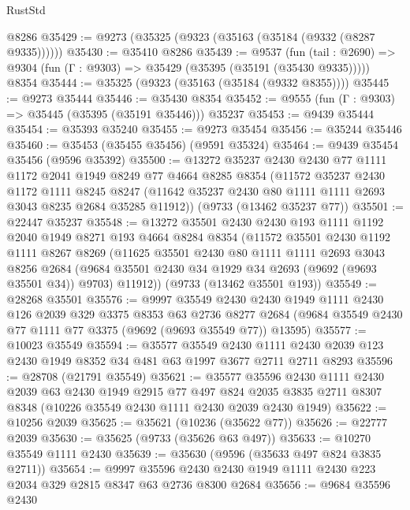 \begin{lexlean}{RustStd}
\begin{coremodule}
{\begin{coremodule}
{{{{{{{{{{{{{{{{{{{{{{{{{{{{{{{{{{{{{{{{{{{{{{{{{{{{{{{    @8286
@35429 := @9273 (@35325 (@9323 (@35163 (@35184 (@9332 (@8287 @9335))))))
@35430 := @35410 @8286
@35439 := @9537
    (fun (tail : @2690) => @9304 (fun (Γ : @9303) => @35429 (@35395 (@35191 (@35430 @9335)))))
    @8354
@35444 := @35325 (@9323 (@35163 (@35184 (@9332 @8355))))
@35445 := @9273 @35444
@35446 := @35430 @8354
@35452 := @9555 (fun (Γ : @9303) => @35445 (@35395 (@35191 @35446))) @35237
@35453 := @9439 @35444
@35454 := @35393 @35240
@35455 := @9273 @35454
@35456 := @35244 @35446
@35460 := @35453 (@35455 @35456) (@9591 @35324)
@35464 := @9439 @35454 @35456 (@9596 @35392)
@35500 := @13272
    @35237
    @2430
    @2430
    @77
    @1111
    @1172
    @2041
    @1949
    @8249
    @77
    @4664
    @8285
    @8354
    (@11572
      @35237
      @2430
      @1172
      @1111
      @8245
      @8247
      (@11642 @35237 @2430 @80 @1111 @1111 @2693 @3043 @8235 @2684 @35285 @11912))
    (@9733 (@13462 @35237 @77))
@35501 := @22447 @35237
@35548 := @13272
    @35501
    @2430
    @2430
    @193
    @1111
    @1192
    @2040
    @1949
    @8271
    @193
    @4664
    @8284
    @8354
    (@11572
      @35501
      @2430
      @1192
      @1111
      @8267
      @8269
      (@11625
        @35501
        @2430
        @80
        @1111
        @1111
        @2693
        @3043
        @8256
        @2684
        (@9684 @35501 @2430 @34 @1929 @34 @2693 (@9692 (@9693 @35501 @34)) @9703)
        @11912))
    (@9733 (@13462 @35501 @193))
@35549 := @28268 @35501
@35576 := @9997
    @35549
    @2430
    @2430
    @1949
    @1111
    @2430
    @126
    @2039
    @329
    @3375
    @8353
    @63
    @2736
    @8277
    @2684
    (@9684 @35549 @2430 @77 @1111 @77 @3375 (@9692 (@9693 @35549 @77)) @13595)
@35577 := @10023 @35549
@35594 := @35577
    @35549
    @2430
    @1111
    @2430
    @2039
    @123
    @2430
    @1949
    @8352
    @34
    @481
    @63
    @1997
    @3677
    @2711
    @2711
    @8293
@35596 := @28708 (@21791 @35549)
@35621 := @35577
    @35596
    @2430
    @1111
    @2430
    @2039
    @63
    @2430
    @1949
    @2915
    @77
    @497
    @824
    @2035
    @3835
    @2711
    @8307
    @8348
    (@10226 @35549 @2430 @1111 @2430 @2039 @2430 @1949)
@35622 := @10256 @2039
@35625 := @35621 (@10236 (@35622 @77))
@35626 := @22777 @2039
@35630 := @35625 (@9733 (@35626 @63 @497))
@35633 := @10270 @35549 @1111 @2430
@35639 := @35630 (@9596 (@35633 @497 @824 @3835 @2711))
@35654 := @9997
    @35596
    @2430
    @2430
    @1949
    @1111
    @2430
    @223
    @2034
    @329
    @2815
    @8347
    @63
    @2736
    @8300
    @2684
@35656 := @9684 @35596 @2430
}}}}}}}}}}}}}}}}}}}}}}}}}}}}}}}}}}}}}}}}}}}}}}}}}}}}}}}
\end{coremodule}}
\end{coremodule}
\end{lexlean}
